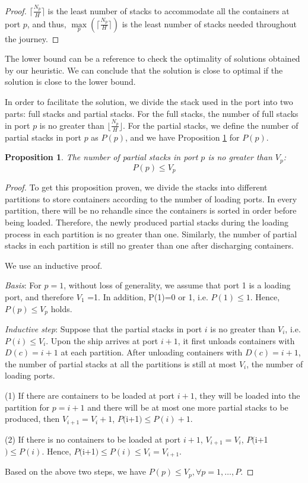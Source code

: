 \documentclass[review,3p,times,authoryear,12pt]{elsarticle}
\newtheorem{proposition}{Proposition}
\begin{document}
\begin{proof}

$\lceil\frac{N_p}{H}\rceil$ is the least number of stacks to accommodate all the containers at port $p$, and thus, $\max\limits_p(\lceil\frac{N_p}{H}\rceil)$ is the least number of stacks needed throughout the journey.
\end{proof}

The lower bound can be a reference to check the optimality of solutions obtained by our heuristic.
We can conclude that the solution is close to optimal if the solution is close to the lower bound.

In order to facilitate the solution, we divide the stack used in the port into two parts: full stacks and partial stacks.
For the full stacks, the number of full stacks in port $p$ is no greater than $\lfloor\frac{N_p}{H}\rfloor$.
For the partial stacks, we define the number of partial stacks in port $p$ as $P(p)$, and we have Proposition \ref{pro:a2} for $P(p)$.
\begin{proposition}
The number of partial stacks in port $p$ is no greater than $V_p$:
\begin{equation*}
 P(p) \le  V_p
\end{equation*}
\label{pro:a2}
\end{proposition}

\begin{proof}

To get this proposition proven, we divide the stacks into different partitions to store containers according to the number of loading ports.
In every partition, there will be no rehandle since the containers is sorted in order before being loaded.
Therefore, the newly produced partial stacks during the loading process in each partition is no greater than one.
Similarly, the number of partial stacks in each partition is still no greater than one after discharging containers.

We use an inductive proof.

\textit{Basis}: For $p=1$, without loss of generality, we assume that port 1 is a loading port, and therefore $V_1$ =1.
In addition, P(1)=0 or 1, i.e. $P(1) \le 1$. Hence, $P(p) \le V_p $ holds.

\textit{Inductive step}: Suppose that the partial stacks in port $i$ is no greater than $V_i$, i.e. $P(i) \le V_i $.
Upon the ship arrives at port $i+1$, it first unloads containers with $D(c)=i+1$ at each partition.
After unloading containers with $D(c)=i+1$, the number of partial stacks at all the partitions is still at most $V_i$, the number of loading ports.

(1) If there are containers to be loaded at port $i+1$, they will be loaded into the partition for $p=i+1$ and there will be at most one more partial stacks to be produced, then $V_{i+1}=V_i+1$,  $P($i+1$) \le P(i)+1$.

(2) If there is no containers to be loaded at port $i+1$,  $V_{i+1}=V_i$, $P($i+1$) \le P(i)$. Hence, $P($i+1$) \le P(i) \le V_{i}=V_{i+1}$.

Based on the above two steps, we have $P(p) \le V_p,  \forall p=1,\ldots,P$.
\end{proof}
\end{document}
